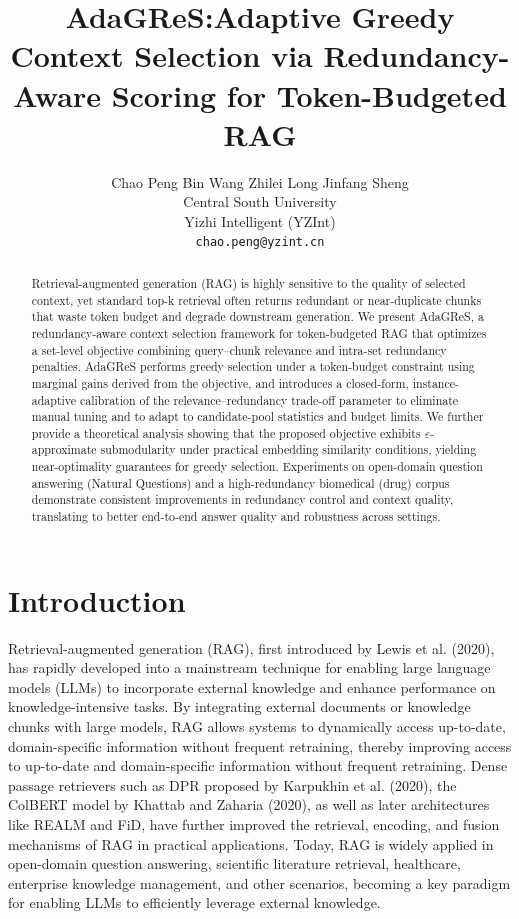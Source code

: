 \documentclass[11pt]{article}
\title{AdaGReS:Adaptive Greedy Context Selection via Redundancy-Aware Scoring for Token-Budgeted RAG}
\author{
Chao Peng \quad Bin Wang \quad Zhilei Long \quad Jinfang Sheng \\
Central South University \\
Yizhi Intelligent (YZInt) \\
\texttt{chao.peng@yzint.cn}
}
\begin{document}
\maketitle
\begin{abstract}
Retrieval-augmented generation (RAG) is highly sensitive to the quality of selected context, yet standard top-k retrieval often returns redundant or near-duplicate chunks that waste token budget and degrade downstream generation. We present AdaGReS, a redundancy-aware context selection framework for token-budgeted RAG that optimizes a set-level objective combining query–chunk relevance and intra-set redundancy penalties. AdaGReS performs greedy selection under a token-budget constraint using marginal gains derived from the objective, and introduces a closed-form, instance-adaptive calibration of the relevance–redundancy trade-off parameter to eliminate manual tuning and to adapt to candidate-pool statistics and budget limits. We further provide a theoretical analysis showing that the proposed objective exhibits $\varepsilon $-approximate submodularity under practical embedding similarity conditions, yielding near-optimality guarantees for greedy selection. Experiments on open-domain question answering (Natural Questions) and a high-redundancy biomedical (drug) corpus demonstrate consistent improvements in redundancy control and context quality, translating to better end-to-end answer quality and robustness across settings.
\end{abstract}

\section{Introduction}

Retrieval-augmented generation (RAG), first introduced by Lewis et al. (2020)\cite{1}, has rapidly developed into a mainstream technique for enabling large language models (LLMs) to incorporate external knowledge and enhance performance on knowledge-intensive tasks. By integrating external documents or knowledge chunks with large models, RAG allows systems to dynamically access up-to-date, domain-specific information without frequent retraining, thereby improving access to up-to-date and domain-specific information without frequent retraining. Dense passage retrievers such as DPR proposed by Karpukhin et al. (2020)\cite{2}, the ColBERT model by Khattab and Zaharia (2020)\cite{3}, as well as later architectures like REALM\cite{4} and FiD\cite{1}, have further improved the retrieval, encoding, and fusion mechanisms of RAG in practical applications. Today, RAG is widely applied in open-domain question answering\cite{6}, scientific literature retrieval\cite{7}, healthcare, enterprise knowledge management, and other scenarios, becoming a key paradigm for enabling LLMs to efficiently leverage external knowledge.
\end{document}
